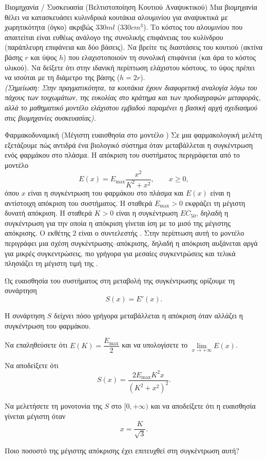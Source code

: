 \begin{problhma}{Βιομηχανία / Συσκευασία (Βελτιστοποίηση Κουτιού Αναψυκτικού)}
Μια βιομηχανία θέλει να κατασκευάσει κυλινδρικά κουτάκια αλουμινίου για αναψυκτικά με χωρητικότητα (όγκο) ακριβώς $330 \si{ml}$ ($330 \si{cm}^3$). Το κόστος του αλουμινίου που απαιτείται είναι ευθέως ανάλογο της συνολικής επιφάνειας του κυλίνδρου (παράπλευρη επιφάνεια και δύο βάσεις). 
Να βρείτε τις διαστάσεις του κουτιού (ακτίνα βάσης $r$ και ύψος $h$) που ελαχιστοποιούν τη συνολική επιφάνεια (και άρα το κόστος υλικού). Να δείξετε ότι στην ιδανική περίπτωση ελάχιστου κόστους, το ύψος πρέπει να ισούται με τη διάμετρο της βάσης ($h=2r$).\\
\textit{(Σημείωση: Στην πραγματικότητα, τα κουτάκια έχουν διαφορετική αναλογία λόγω του πάχους των τοιχωμάτων, της ευκολίας στο κράτημα και των προδιαγραφών μεταφοράς, αλλά το μαθηματικό μοντέλο ελάχιστου εμβαδού παραμένει η βασική αρχή σχεδιασμού στις βιομηχανίες συσκευασίας).}
\end{problhma}

\begin{problhma}{Φαρμακοδυναμική (Μέγιστη ευαισθησία στο μοντέλο )}
Σε μια φαρμακολογική μελέτη εξετάζουμε πώς αντιδρά ένα βιολογικό
σύστημα όταν μεταβάλλεται η συγκέντρωση ενός φαρμάκου στο πλάσμα. Η απόκριση του συστήματος περιγράφεται από το μοντέλο 
\[
  E(x)=E_{\max}\frac{x^2}{K^2+x^2},
  \qquad x\geq0,
\]
όπου $x$ είναι η συγκέντρωση του φαρμάκου στο πλάσμα και $E(x)$ είναι
η αντίστοιχη απόκριση του συστήματος.
Η σταθερά $E_{\max}>0$ εκφράζει τη μέγιστη δυνατή απόκριση. Η σταθερά
$K>0$ είναι η συγκέντρωση $EC_{50}$, δηλαδή η συγκέντρωση για την οποία
η απόκριση γίνεται ίση με το μισό της μέγιστης απόκρισης. Ο εκθέτης $2$ είναι ο συντελεστής . Στην περίπτωση αυτή το
μοντέλο περιγράφει μια σχέση συγκέντρωσης--απόκρισης, δηλαδή
η απόκριση αυξάνεται αργά για μικρές συγκεντρώσεις, πιο γρήγορα για
μεσαίες συγκεντρώσεις και τελικά πλησιάζει τη μέγιστη τιμή της
\cite{goutelle2008hill}.

Ως ευαισθησία του συστήματος στη μεταβολή της συγκέντρωσης ορίζουμε τη
συνάρτηση
\[
  S(x)=E'(x).
\]

Η συνάρτηση $S$ δείχνει πόσο γρήγορα μεταβάλλεται η απόκριση όταν
αλλάζει η συγκέντρωση του φαρμάκου.

\begin{alist}
  \item Να επαληθεύσετε ότι $E(K)=\dfrac{E_{\max}}{2}$ και να
        υπολογίσετε το $\displaystyle\lim\limits_{x\to+\infty}E(x)$.
  \item Να αποδείξετε ότι
        \[
          S(x)=\frac{2E_{\max}K^2x}{(K^2+x^2)^2}.
        \]
  \item Να μελετήσετε τη μονοτονία της $S$ στο $[0,+\infty)$ και να
        αποδείξετε ότι η ευαισθησία γίνεται μέγιστη όταν
        \[
          x=\frac{K}{\sqrt3}.
        \]
  \item Ποιο ποσοστό της μέγιστης απόκρισης έχει επιτευχθεί στη
        συγκέντρωση αυτή?
\end{alist}
\end{problhma}

